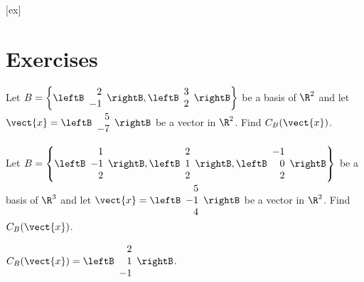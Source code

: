 [ex]
\section*{Exercises}

\begin{enumialphparenastyle}

\begin{ex}
Let $B = \left\{ \leftB \begin{array}{r}
2 \\
-1 
\end{array} \rightB, \leftB \begin{array}{r}
3 \\
2
\end{array} \rightB \right\}$ be a basis of $\R^2$ and let $\vect{x} = \leftB
\begin{array}{r}
5 \\
-7
\end{array}
\rightB$ be a vector in $\R^2$. Find $C_B(\vect{x})$. 
\end{ex}

\begin{ex}
Let $B = \left\{ \leftB \begin{array}{r}
1 \\
-1 \\
2 
\end{array} \rightB, \leftB \begin{array}{r}
2 \\
1 \\
2
 \end{array} \rightB, \leftB \begin{array}{r}
-1 \\
0 \\
2
\end{array} \rightB \right\}$ 
be a basis of $\R^3$ and let $\vect{x} = \leftB
\begin{array}{r}
5 \\
-1 \\
4
\end{array}
\rightB$ be a vector in $\R^2$. Find $C_B(\vect{x})$. 
\begin{sol}
 $C_B(\vect{x}) = 
\leftB \begin{array}{r}
2 \\
1 \\
-1
 \end{array} \rightB $.
\end{sol}
\end{ex}



\end{enumialphparenastyle}
